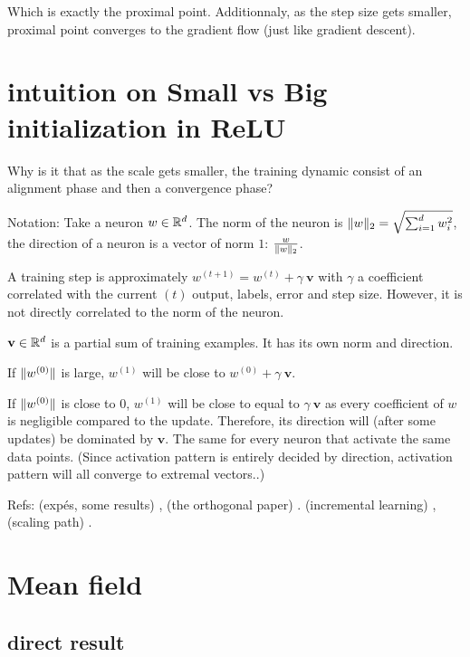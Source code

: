 Which is exactly the proximal point. Additionnaly, as the step size gets smaller, proximal point converges to the gradient flow (just like gradient descent).

\section{intuition on Small vs Big initialization in ReLU}

Why is it that as the scale gets smaller, the training dynamic consist of an alignment phase and then a convergence phase?

Notation: Take a neuron $w \in \mathbb{R}^d$. The norm of the neuron is $\lVert w\rVert_2 = \sqrt{\sum_{i=1}^{d} w_i^2}$, the direction of a neuron is a vector of norm $1$: $\frac{w}{\lVert w\rVert_2}$.

A training step is approximately $w^{(t+1)} = w^{(t)} + \gamma ~ \mathbf{v}$ with $\gamma$ a coefficient correlated with the current $(t)$ output, labels, error and step size. However, it is not directly correlated to the norm of the neuron.

$\mathbf{v} \in \mathbb{R}^d$ is a partial sum of training examples. It has its own norm and direction.

If $\lVert w^{(0)}\rVert$ is large, $w^{(1)}$ will be close to $w^{(0)} + \gamma ~ \mathbf{v}$.

If $\lVert w^{(0)}\rVert$ is close to 0, $w^{(1)}$ will be close to equal to $\gamma ~ \mathbf{v}$ as every coefficient of $w$ is negligible compared to the update. Therefore, its direction will (after some updates) be dominated by $\mathbf{v}$. The same for every neuron that activate the same data points. (Since activation pattern is entirely decided by direction, activation pattern will all converge to extremal vectors..)

Refs: (expés, some results) \citep{maennel2018gradient}, (the orthogonal paper) \citep{boursierGradientFlowDynamics2022}. (incremental learning) \citep{berthierIncrementalLearningDiagonal}, (scaling path) \citep{neumayerEffectInitializationScaling2023}.

\section{Mean field}



\subsection{direct result}

